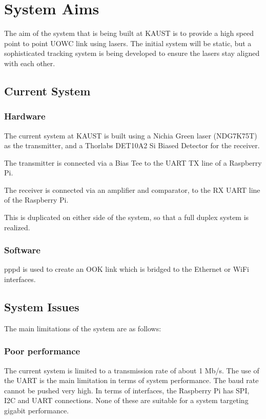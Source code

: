 \documentclass{article}
\begin{document}
\section{System Aims}
The aim of the system that is being built at \ac{KAUST} is to provide a high speed point to point \ac{UOWC} link using lasers. The initial system will be static, but a sophisticated tracking system is being developed to ensure the lasers stay aligned with each other.

\subsection{Current System}

\subsubsection{Hardware}
The current system at \ac{KAUST} is built using a Nichia Green laser (NDG7K75T) as the transmitter, and a Thorlabs DET10A2 Si Biased Detector for the receiver.

The transmitter is connected via a Bias Tee to the UART TX line of a Raspberry Pi.

The receiver is connected via an amplifier and comparator, to the RX UART line of the Raspberry Pi.

This is duplicated on either side of the system, so that a full duplex system is realized.

\subsubsection{Software}
pppd is used to create an OOK link which is bridged to the Ethernet or WiFi interfaces.

\subsection{System Issues}
The main limitations of the system are as follows:

\subsubsection{Poor performance}
The current system is limited to a transmission rate of about 1 Mb/s. The use of the UART is the main limitation in terms of system performance. The baud rate cannot be pushed very high. In terms of interfaces, the Raspberry Pi has SPI, I2C and UART connections. None of these are suitable for a system targeting gigabit performance.
\end{document}
